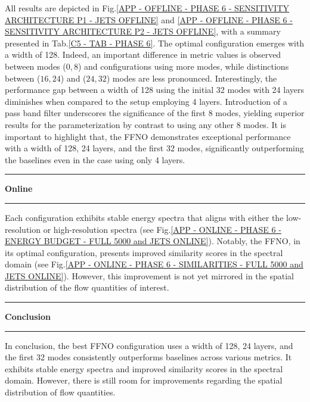 All results are depicted in Fig.\ref{APP - OFFLINE - PHASE 6 - SENSITIVITY ARCHITECTURE P1 - JETS OFFLINE} and \ref{APP - OFFLINE - PHASE 6 - SENSITIVITY ARCHITECTURE P2 - JETS OFFLINE}, with a summary presented in Tab.\ref{C5 - TAB - PHASE 6}. The optimal configuration emerges with a width of 128. Indeed, an important difference in metric values is observed between modes ($0, 8$) and configurations using more modes, while distinctions between ($16, 24$) and ($24, 32$) modes are less pronounced. Interestingly, the performance gap between a width of 128 using the initial 32 modes with 24 layers diminishes when compared to the setup employing 4 layers. Introduction of a pass band filter underscores the significance of the first 8 modes, yielding superior results for the parameterization by contrast to using any other 8 modes. It is important to highlight that, the FFNO demonstrates exceptional performance with a width of 128, 24 layers, and the first 32 modes, significantly outperforming the baselines even in the case using only 4 layers.

\rule[0cm]{\linewidth}{0.025cm}
\begin{center}
\small \textbf{Online}
\end{center}
\rule[0.3cm]{\linewidth}{0.025cm}

Each configuration exhibits stable energy spectra that aligns with either the low-resolution or high-resolution spectra (see Fig.\ref{APP - ONLINE - PHASE 6 - ENERGY BUDGET -  FULL 5000 and JETS ONLINE}). Notably, the FFNO, in its optimal configuration, presents improved similarity scores in the spectral domain (see Fig.\ref{APP - ONLINE - PHASE 6 - SIMILARITIES -  FULL 5000 and JETS ONLINE}). However, this improvement is not yet mirrored in the spatial distribution of the flow quantities of interest.

\rule[0cm]{\linewidth}{0.025cm}
\begin{center}
\small \textbf{Conclusion}
\end{center}
\rule[0.3cm]{\linewidth}{0.025cm}

In conclusion, the best FFNO  configuration uses a width of 128, 24 layers, and the first 32 modes consistently outperforms baselines across various metrics. It exhibits stable energy spectra and improved similarity scores in the spectral domain. However, there is still room for improvements regarding the spatial distribution of flow quantities.





